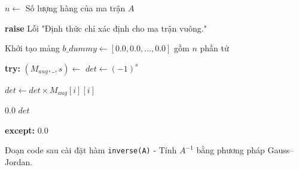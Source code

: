 



\begin{algorithm}[H]
\caption{Tính định thức của ma trận qua phép khử Gauss}
\label{alg:determinant}
\begin{algorithmic}[1]
    \State $n \gets$ Số lượng hàng của ma trận $A$
    
        \State \textbf{raise} Lỗi "Định thức chỉ xác định cho ma trận vuông."
    \EndIf
    
    \State Khởi tạo mảng $b\_dummy \gets [0.0, 0.0, \dots, 0.0]$ gồm $n$ phần tử
    
    \State \textbf{try:}
        \State $(M_{aug}, \_, s) \gets$ 
        \State $det \gets (-1)^s$ 
        
            \State $det \gets det \times M_{aug}[i][i]$ 
        \EndFor
        
            \State \Return $0.0$ 
        \Else
            \State \Return $det$
        \EndIf
        
    \State \textbf{except:} 
        \State \Return $0.0$
\EndProcedure
\end{algorithmic}
\end{algorithm}

Đoạn code sau cài đặt hàm \texttt{inverse(A)} - Tính $A^{-1}$ bằng phương pháp Gauss–Jordan.

